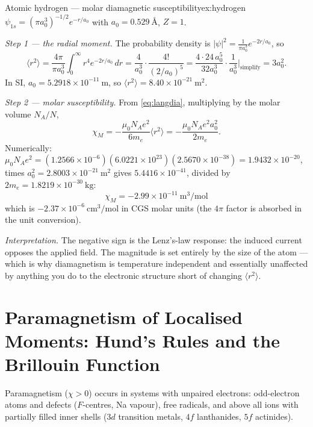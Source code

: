 \documentclass[11pt,a4paper]{article}
\newcommand{\Ang}{\text{\AA}}
\begin{document}
\begin{examplebox}{Atomic hydrogen --- molar diamagnetic susceptibility}{ex:hydrogen}
$\psi_{1s} = (\pi a_0^3)^{-1/2}e^{-r/a_0}$ with $a_0 = 0.529\ \Ang$, $Z = 1$.

\medskip
\textit{Step 1 --- the radial moment.} The probability density is $|\psi|^2 = \frac{1}{\pi a_0^3}e^{-2r/a_0}$, so
\[
\langle r^2\rangle = \frac{4\pi}{\pi a_0^3}\int_0^\infty r^4e^{-2r/a_0}\,dr
= \frac{4}{a_0^3}\cdot\frac{4!}{(2/a_0)^5}
= \frac{4\cdot24\,a_0^5}{32a_0^3}\cdot\frac{1}{a_0^3}\Big|_{\text{simplify}}
= 3a_0^2 .
\]
In SI, $a_0 = 5.2918\times10^{-11}\ \mathrm{m}$, so $\langle r^2\rangle = 8.40\times10^{-21}\ \mathrm{m^2}$.

\medskip
\textit{Step 2 --- molar susceptibility.} From \eqref{eq:langdia}, multiplying by the molar volume $N_A/N$,
\[
\chi_M = -\frac{\mu_0 N_A e^2}{6m_e}\langle r^2\rangle
= -\frac{\mu_0 N_A e^2 a_0^2}{2m_e}.
\]
Numerically: $\mu_0 N_A e^2 = (1.2566\times10^{-6})(6.0221\times10^{23})(2.5670\times10^{-38}) = 1.9432\times10^{-20}$, times $a_0^2 = 2.8003\times10^{-21}\ \mathrm{m^2}$ gives $5.4416\times10^{-41}$, divided by $2m_e = 1.8219\times10^{-30}\ \mathrm{kg}$:
\[
\boxed{\chi_M = -2.99\times10^{-11}\ \mathrm{m^3/mol}}
\]
which is $-2.37\times10^{-6}\ \mathrm{cm^3/mol}$ in CGS molar units (the $4\pi$ factor is absorbed in the unit conversion).

\medskip
\textit{Interpretation.} The negative sign is the Lenz's-law response: the induced current opposes the applied field. The magnitude is set entirely by the size of the atom --- which is why diamagnetism is temperature independent and essentially unaffected by anything you do to the electronic structure short of changing $\langle r^2\rangle$.
\end{examplebox}

\section{Paramagnetism of Localised Moments: Hund's Rules and the Brillouin Function}
\label{ch:localparamag}

Paramagnetism ($\chi > 0$) occurs in systems with unpaired electrons: odd-electron atoms and defects ($F$-centres, Na vapour), free radicals, and above all ions with partially filled inner shells ($3d$ transition metals, $4f$ lanthanides, $5f$ actinides).
\end{document}
